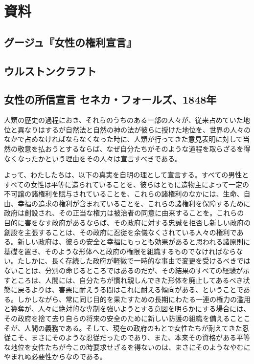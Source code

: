 \documentclass[dvipdfmx,uplatex]{jsarticle}
\begin{document}



\twocolumn{}
\section{資料}


\subsection{グージュ『女性の権利宣言』}


\subsection{ウルストンクラフト}



\subsection{女性の所信宣言 セネカ・フォールズ、1848年}
\label{sentiment}

  

人類の歴史の過程におき、それらのうちのある一部の人々が、従来占めていた地位と異なりはするが自然法と自然の神の法が彼らに授けた地位を、世界の人々のなかで占めなければならなくなった時に、人類が行ってきた意見表明に対して当然の敬意を払おうとするならば、なぜ自分たちがそのような道程を取らざるを得なくなったかという理由をその人々は宣言すべきである。

よって、わたしたちは、以下の真実を自明の理として宣言する。すべての男性とすべての女性は平等に造られていることを、彼らはともに造物主によって一定の不可譲の諸権利を賦与されていることを、これらの諸権利のなかには、生命、自由、幸福の追求の権利が含まれていることを、これらの諸権利を保障するために政府は創設され、その正当な権力は被治者の同意に由来することを。これらの目的に害をなす政府があるならば、その政府に対する忠誠を拒否し新しい政府の創設を主張することは、その政府に忍従を余儀なくされている人々の権利である。新しい政府は、彼らの安全と幸福にもっとも効果があると思われる諸原則に基礎を置き、そのような形体へと政府の権限を組織するものでなければならない。たしかに、長く存続した政府が軽微で一時的な事由で変更を受けるべきではないことは、分別の命じるところではあるのだが、その結果のすべての経験が示すところは、人間には、自分たちが慣れ親しんできた形体を廃止してあるべき状態に戻るよりは、害悪に耐えうる間はこれに耐える傾向がある、ということである。しかしながら、常に同じ目的を果たすための長期にわたる一連の権力の濫用と簒奪が、人々に絶対的な専制を強いようとする意図を明らかにする場合には、その政府を捨て去り自らの将来の安全のために新しい防護の組織を備えることこそが、人間の義務である。そして、現在の政府のもとで女性たちが耐えてきた忍従こそ、まさにそのような忍従だったのであり、また、本来その資格がある平等な地位を女性たちが今この時要求せざるを得ないのは、まさにそのようなやむにやまれぬ必要性からなのである。
\end{document}

